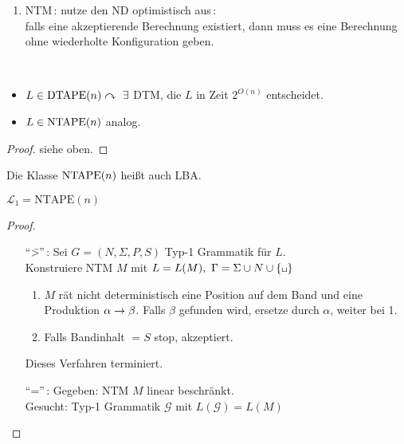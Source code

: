 {\begin{Bemerkung}
\begin{enumerate}
	falls sie akzeptiert, dann in weniger als $N$ Schritten,\\
	falls nach $N$ Schritten keine Termination erfolgt\\
	\quad$\curvearrowright$ Endlosschleife -- Abbruch
	\item \ac{NTM}\,: nutze den \ac{ND} optimistisch aus\,:\\
	falls eine akzeptierende Berechnung existiert, dann muss es eine Berechnung ohne wiederholte Konfiguration geben.
	\end{enumerate}
\end{Bemerkung}
\begin{Satz}[name={[$L\in\DTAPE(n),\ L\in\NTAPE(n)$]}]\label{satz:6.2}\
	\begin{itemize}
	\item $L\in\DTAPE(n) \curvearrowright\ \exists$ \ac{DTM}, die $L$ in Zeit $2^{O(n)}$ entscheidet.
	\item $L\in\operatorname{NTAPE}(n)$ analog.
	\end{itemize}
\end{Satz}\vspace{-2em}
\begin{proof}
	siehe oben.
\end{proof}
\begin{Bemerkung}
	Die Klasse $\operatorname{NTAPE} (n)$ heißt auch \ac{LBA}.
\end{Bemerkung}
%
\begin{Satz}\label{satz:6.3}
	$\mathcal L_1=\mathrm{NTAPE}(n)$
\end{Satz}
\begin{proof}\
\begin{itemize}
	\item["`\=>"'\,:] Sei $G=(N,\Sigma,P,S)$ Typ-1 Grammatik für $L$.\\
		Konstruiere \ac{NTM} $M$ mit $L=L(M),\ \Gamma = \Sigma\cup N\cup\{\blank\}$
		\begin{enumerate}
		\item $M$ rät nicht deterministisch eine Position auf
                  dem Band und eine Produktion $\alpha\-> \beta$. Falls $\beta$ gefunden wird, ersetze durch $\alpha$, weiter bei 1.
		\item Falls Bandinhalt $=S$ \quad stop, akzeptiert.
		\end{enumerate}
		Dieses Verfahren terminiert.
	\item["`\<="'\,:] %
	Gegeben: \ac{NTM} $M$ linear beschränkt.\\
	Gesucht: Typ-1 Grammatik $\mathcal{G}$ mit $L(\mathcal{G})=L(M)$\\

\end{itemize}
\end{proof}}

